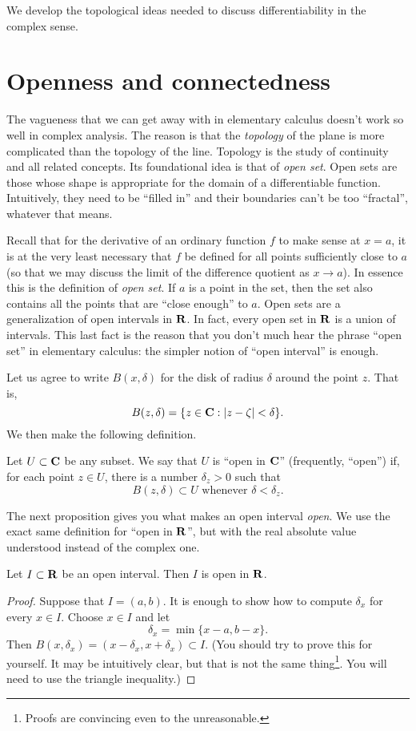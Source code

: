 \documentclass[twocolumn,12pt]{article}
\date{February 20, 2013 (Wed)}
\begin{document}
\makeheader

\begin{summary}
We develop the topological ideas needed to discuss differentiability in the complex sense.
\end{summary}
\section{Openness and connectedness}
The vagueness that we can get away with in elementary calculus doesn't work so well in complex analysis. The reason is that the \emph{topology} of the plane is more complicated than the topology of the line. Topology is the study of continuity and all related concepts. Its foundational idea is that of \emph{open set}. Open sets are those whose shape is appropriate for the domain of a differentiable function. Intuitively, they need to be ``filled in'' and their boundaries can't be too ``fractal'', whatever that means.

Recall that for the derivative of an ordinary function $f$ to make sense at $x = a$, it is at the very least necessary that $f$ be defined for all points sufficiently close to $a$ (so that we may discuss the limit of the difference quotient as $x \to a$). In essence this is the definition of \emph{open set}. If $a$ is a point in the set, then the set also contains all the points that are ``close enough'' to $a$. Open sets are a generalization of open intervals in $\mathbf{R}$. In fact, every open set in $\mathbf{R}$ is a union of intervals. This last fact is the reason that you don't much hear the phrase ``open set'' in elementary calculus: the simpler notion of ``open interval'' is enough.

Let us agree to write $B(x, \delta)$ for the disk of radius $\delta$ around the point $z$. That is, 
\[
    B(z, \delta) = \{ z \in \mathbf{C} : |z - \zeta| < \delta \}.
\]
We then make the following definition.
\begin{definition}
    Let $U \subset \mathbf{C}$ be any subset. We say that $U$ is ``open in $\mathbf{C}$'' (frequently, ``open'') if, for each point $z \in U$, there is a number $\delta_z > 0$ such that
    \[
        B(z, \delta) \subset U \text{ whenever } \delta < \delta_z.
    \]
\end{definition}
The next proposition gives you what makes an open interval \emph{open}. We use the exact same definition for ``open in $\mathbf{R}$'', but with the real absolute value understood instead of the complex one.
\begin{proposition}
    Let $I \subset \mathbf{R}$ be an open interval. Then $I$ is open in $\mathbf{R}$.
\end{proposition}
\begin{proof}
    Suppose that $I = (a,b)$. It is enough to show how to compute $\delta_x$ for every $x \in I$. Choose $x \in I$ and let
    \[
        \delta_x = \min \{ x - a, b - x \}.
    \]
    Then $B(x, \delta_x) = (x - \delta_x, x + \delta_x) \subset I$. (You should try to prove this for yourself. It may be intuitively clear, but that is not the same thing\footnote{Proofs are convincing even to the unreasonable.}. You will need to use the triangle inequality.)
\end{proof}
\end{document}
